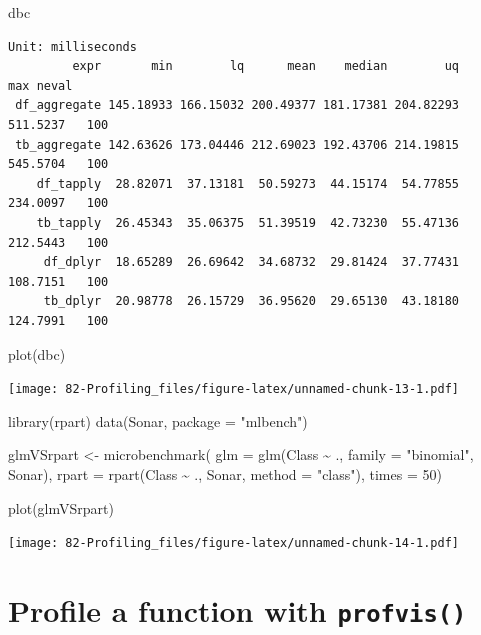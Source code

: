 \documentclass[
]{book}
\newenvironment{Shaded}{\begin{snugshade}}{\end{snugshade}}
\newcommand{\AttributeTok}[1]{\textcolor[rgb]{0.77,0.63,0.00}{#1}}
\newcommand{\DecValTok}[1]{\textcolor[rgb]{0.00,0.00,0.81}{#1}}
\newcommand{\FunctionTok}[1]{\textcolor[rgb]{0.00,0.00,0.00}{#1}}
\newcommand{\NormalTok}[1]{#1}
\newcommand{\OtherTok}[1]{\textcolor[rgb]{0.56,0.35,0.01}{#1}}
\newcommand{\SpecialCharTok}[1]{\textcolor[rgb]{0.00,0.00,0.00}{#1}}
\newcommand{\StringTok}[1]{\textcolor[rgb]{0.31,0.60,0.02}{#1}}
\begin{document}
\begin{Shaded}
\begin{Highlighting}[]
\NormalTok{dbc}
\end{Highlighting}
\end{Shaded}

\begin{verbatim}
Unit: milliseconds
         expr       min        lq      mean    median        uq      max neval
 df_aggregate 145.18933 166.15032 200.49377 181.17381 204.82293 511.5237   100
 tb_aggregate 142.63626 173.04446 212.69023 192.43706 214.19815 545.5704   100
    df_tapply  28.82071  37.13181  50.59273  44.15174  54.77855 234.0097   100
    tb_tapply  26.45343  35.06375  51.39519  42.73230  55.47136 212.5443   100
     df_dplyr  18.65289  26.69642  34.68732  29.81424  37.77431 108.7151   100
     tb_dplyr  20.98778  26.15729  36.95620  29.65130  43.18180 124.7991   100
\end{verbatim}

\begin{Shaded}
\begin{Highlighting}[]
\FunctionTok{plot}\NormalTok{(dbc)}
\end{Highlighting}
\end{Shaded}

\texttt{[image: 82-Profiling\_files/figure-latex/unnamed-chunk-13-1.pdf]}

\begin{Shaded}
\begin{Highlighting}[]
\FunctionTok{library}\NormalTok{(rpart)}
\FunctionTok{data}\NormalTok{(Sonar, }\AttributeTok{package =} \StringTok{"mlbench"}\NormalTok{)}

\NormalTok{glmVSrpart }\OtherTok{\textless{}{-}} \FunctionTok{microbenchmark}\NormalTok{(}
  \AttributeTok{glm =} \FunctionTok{glm}\NormalTok{(Class }\SpecialCharTok{\textasciitilde{}}\NormalTok{ ., }\AttributeTok{family =} \StringTok{"binomial"}\NormalTok{, Sonar),}
  \AttributeTok{rpart =} \FunctionTok{rpart}\NormalTok{(Class }\SpecialCharTok{\textasciitilde{}}\NormalTok{ ., Sonar, }\AttributeTok{method =} \StringTok{"class"}\NormalTok{),}
  \AttributeTok{times =} \DecValTok{50}\NormalTok{)}

\FunctionTok{plot}\NormalTok{(glmVSrpart)}
\end{Highlighting}
\end{Shaded}

\texttt{[image: 82-Profiling\_files/figure-latex/unnamed-chunk-14-1.pdf]}

\hypertarget{profile-a-function-with-profvis}{%
\section{\texorpdfstring{Profile a function with \texttt{profvis()}}{Profile a function with profvis()}}\label{profile-a-function-with-profvis}}
\end{document}
